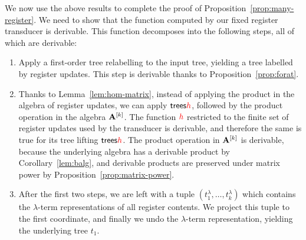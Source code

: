  We now use the above results to complete the proof of Proposition~\ref{prop:many-register}. We need to show that the function computed by our fixed register transducer is derivable. This function decomposes into the following steps, all of which are derivable:    
     \begin{enumerate}
        \item Apply a first-order tree relabelling to the input tree, yielding a tree labelled by register updates. This step is derivable thanks to Proposition~\ref{prop:forat}.
        \item  Thanks to Lemma~\ref{lem:hom-matrix}, instead of applying the product in the algebra of register updates, we can  apply  $\mathsf {trees} {\color{red}{h}}$, followed by the product operation in the algebra ${\color{black}\mathbf A}^{[k]}$. The function ${\color{red}{h}}$ restricted to the finite set of register updates used by the transducer is derivable, and therefore the same is true for its tree lifting $\mathsf {trees} {\color{red}{h}}$. The product operation in ${\color{black}\mathbf A}^{[k]}$ is derivable, because the  underlying algebra has a derivable product  by Corollary~\ref{lem:balg}, and derivable products  are preserved under matrix power by  Proposition~\ref{prop:matrix-power}.
        \item After the first two steps, we are left with a tuple $(t^\lambda_1,\ldots,t^\lambda_k)$ which contains the  $\lambda$-term representations of all register contents. We project this tuple to the first coordinate, and finally we undo the $\lambda$-term representation, yielding the underlying tree $t_1$. 
    \end{enumerate} 
